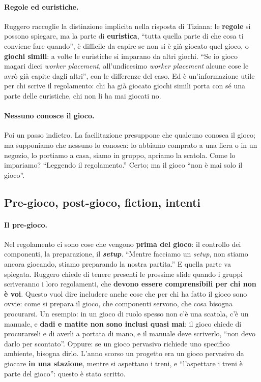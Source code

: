 \paragraph{Regole ed euristiche.} Ruggero raccoglie la distinzione implicita nella
risposta di Tiziana: le \textbf{regole} si possono spiegare, ma la parte di
\textbf{euristica}, ``tutta quella parte di che cosa ti conviene fare quando'', è
difficile da capire se non si è già giocato quel gioco, o \textbf{giochi simili}: a
volte le euristiche si imparano da altri giochi. ``Se io gioco magari dieci
\emph{worker placement}, all'undicesimo \emph{worker placement} alcune cose le avrò già
capite dagli altri'', con le differenze del caso. Ed è un'informazione utile per chi
scrive il regolamento: chi ha già giocato giochi simili porta con sé una parte delle
euristiche, chi non li ha mai giocati no.

\paragraph{Nessuno conosce il gioco.} Poi un passo indietro. La facilitazione presuppone
che qualcuno conosca il gioco; ma supponiamo che nessuno lo conosca: lo abbiamo comprato
a una fiera o in un negozio, lo portiamo a casa, siamo in gruppo, apriamo la scatola.
Come lo impariamo? ``Leggendo il regolamento.'' Certo; ma il gioco ``non è mai solo il
gioco''.

\subsection{Pre-gioco, post-gioco, fiction, intenti}



\paragraph{Il pre-gioco.} Nel regolamento ci sono cose che vengono \textbf{prima del
gioco}: il controllo dei componenti, la preparazione, il \textbf{\emph{setup}}. ``Mentre
facciamo un \emph{setup}, non stiamo ancora giocando, stiamo preparando la nostra
partita.'' E quella parte va spiegata. Ruggero chiede di tenere presenti le prossime
slide quando i gruppi scriveranno i loro regolamenti, che \textbf{devono essere
comprensibili per chi non è voi}. Questo vuol dire includere anche cose che per chi ha
fatto il gioco sono ovvie: come si prepara il gioco, che componenti servono, che cosa
bisogna procurarsi. Un esempio: in un gioco di ruolo spesso non c'è una scatola, c'è un
manuale, e \textbf{dadi e matite non sono inclusi quasi mai}: il gioco chiede di
procurarseli e di averli a portata di mano, e il manuale deve scriverlo, ``non devo
darlo per scontato''. Oppure: se un gioco pervasivo richiede uno specifico ambiente,
bisogna dirlo. L'anno scorso un progetto era un gioco pervasivo da giocare \textbf{in una
stazione}, mentre si aspettano i treni, e ``l'aspettare i treni è parte del gioco'':
questo è stato scritto.

